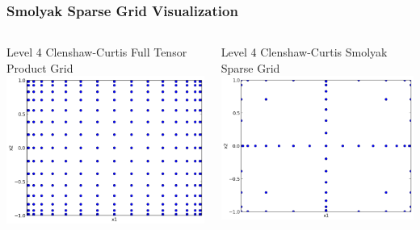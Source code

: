 \documentclass{beamer}
\begin{document}
\begin{frame}
\frametitle{Smolyak Sparse Grid Visualization}

\begin{columns}
 \begin{column}{0.5\textwidth}
  \centering
  Level 4 Clenshaw-Curtis Full Tensor Product Grid
  \includegraphics[width=1.\textwidth]{./tensor_prod_grid_L4.png}
 \end{column}
 \begin{column}{0.5\textwidth}
  \centering
  Level 4 Clenshaw-Curtis Smolyak Sparse Grid
  \includegraphics[width=1.\textwidth]{./sparse_grid_L4.png}
 \end{column}
\end{columns}

\end{frame}
\end{document}
